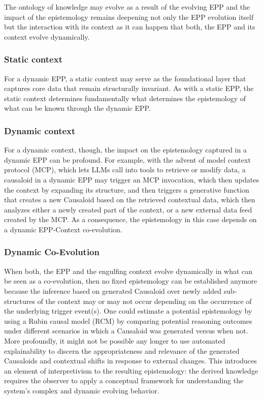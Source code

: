 \documentclass{article}
\begin{document}
The ontology of knowledge may evolve as a result of the evolving EPP and the impact of the epistemology remains deepening not only the EPP evolution itself but the interaction with its context as it can happen that both, the EPP and its context evolve dynamically.

\subsubsection{Static context}

For a dynamic EPP, a static context may serve as the foundational layer that captures core data that remain structurally invariant. As with a static EPP, the static context determines fundamentally what determines the epistemology of what can be known through the dynamic EPP.

\newpage

\subsubsection{Dynamic context}

For a dynamic context, though, the impact on the epistemology captured in a dynamic EPP can be profound. For example, with the advent of model context protocol (MCP), which lets LLMs call into tools to retrieve or modify data, a causaloid in a dynamic EPP may trigger an MCP invocation, which then updates the context by expanding its structure, and then triggers a generative function that creates a new Causaloid based on the retrieved contextual data, which then analyzes either a newly created part of the context, or a new external data feed created by the MCP. As a consequence, the epistemology in this case depends on a dynamic EPP-Context co-evolution.


\subsubsection{Dynamic Co-Evolution}


When both, the EPP and the engulfing context evolve dynamically in what can be seen as a co-evolution, then no fixed epistemology can be established anymore because the inference based on generated Causaloid over newly added sub-structures of the context may or may not occur depending on the occurrence of the underlying trigger event(s). One could estimate a potential epistemology by using a Rubin causal model\cite{rubin2005causal} (RCM) by comparing potential reasoning outcomes under different scenarios in which a Causaloid was generated versus when not. More profoundly, it might not be possible any longer to use automated explainability to discern the appropriateness and relevance of the generated Causaloids and contextual shifts in response to external changes. This introduces an element of interpretivism to the resulting epistemology: the derived knowledge requires the observer to apply a conceptual framework for understanding the system's complex and dynamic evolving behavior.
\end{document}
